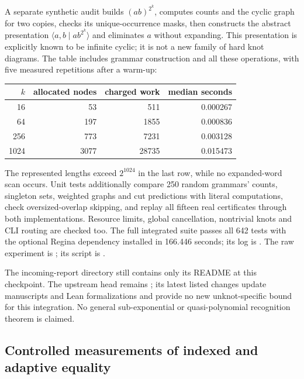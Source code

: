 A separate synthetic audit builds $(ab)^{2^k}$, computes counts and the
cyclic graph for two copies, checks its unique-occurrence masks, then
constructs the abstract presentation $\langle a,b\mid ab^{2^k}\rangle$
and eliminates $a$ without expanding. This presentation is explicitly
known to be infinite cyclic; it is not a new family of hard knot diagrams.
The table includes grammar construction and all these operations, with
five measured repetitions after a warm-up:
\begin{center}
\begin{tabular}{rrrr}
\toprule
$k$ & allocated nodes & charged work & median seconds\\
\midrule
16 & 53 & 511 & 0.000267\\
64 & 197 & 1855 & 0.000836\\
256 & 773 & 7231 & 0.003128\\
1024 & 3077 & 28735 & 0.015473\\
\bottomrule
\end{tabular}
\end{center}
The represented lengths exceed $2^{1024}$ in the last row, while no
expanded-word scan occurs. Unit tests additionally compare 250 random
grammars' counts, singleton sets, weighted graphs and cut predictions with
literal computations, check oversized-overlap skipping, and replay all
fifteen real certificates through both implementations. Resource limits,
global cancellation, nontrivial knots and CLI routing are checked too.
The full integrated suite passes all 642 tests with the optional Regina
dependency installed in 166.446 seconds; its log is
.
The raw experiment is
; its script is
.

The incoming-report directory still contains only its README at this
checkpoint. The upstream  head remains
; its latest listed changes
update manuscripts and Lean formalizations and provide no new
unknot-specific bound for this integration. No general sub-exponential or
quasi-polynomial recognition theorem is claimed.

\subsection{Controlled measurements of indexed and adaptive equality}


